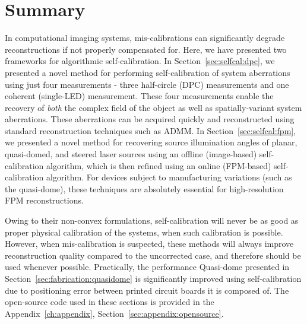 \section{Summary}

In computational imaging systems, mis-calibrations can significantly degrade reconstructions if not properly compensated for. Here, we have presented two frameworks for algorithmic self-calibration. In Section~\ref{sec:selfcal:dpc}, we presented a novel method for performing self-calibration of system aberrations using just four measurements - three half-circle (DPC) measurements and one coherent (single-LED) measurement. These four measurements enable the recovery of \textit{both} the complex field of the object as well as spatially-variant system aberrations. These aberrations can be acquired quickly and reconstructed using standard reconstruction techniques such as ADMM. In Section~\ref{sec:selfcal:fpm}, we presented a novel method for recovering source illumination angles of planar, quasi-domed, and steered laser sources using an offline (image-based) self-calibration algorithm, which is then refined using an online (FPM-based) self-calibration algorithm. For devices subject to manufacturing variations (such as the quasi-dome), these techniques are absolutely essential for high-resolution FPM reconstructions.

Owing to their non-convex formulations, self-calibration will never be as good as proper physical calibration of the systems, when such calibration is possible. However, when mis-calibration is suspected, these methods will always improve reconstruction quality compared to the uncorrected case, and therefore should be used whenever possible. Practically, the performance Quasi-dome presented in Section~\ref{sec:fabrication:quasidome} is significantly improved using self-calibration due to positioning error between printed circuit boards it is composed of. The open-source code used in these sections is provided in the Appendix~\ref{ch:appendix}, Section~\ref{sec:appendix:opensource}.
